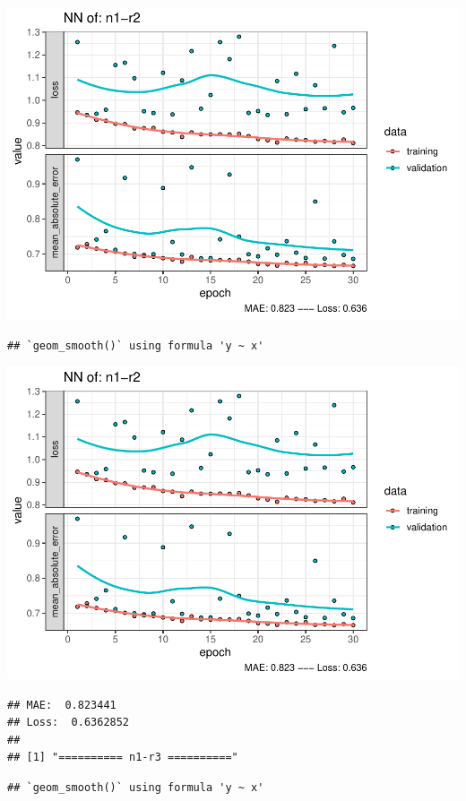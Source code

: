 \documentclass[
]{article}
\begin{document}
\includegraphics{project-code_files/figure-latex/unnamed-chunk-18-13.pdf}

\begin{verbatim}
## `geom_smooth()` using formula 'y ~ x'
\end{verbatim}

\includegraphics{project-code_files/figure-latex/unnamed-chunk-18-14.pdf}

\begin{verbatim}
## MAE:  0.823441
## Loss:  0.6362852 
## 
## [1] "========== n1-r3 =========="
\end{verbatim}

\begin{verbatim}
## `geom_smooth()` using formula 'y ~ x'
\end{verbatim}
\end{document}
